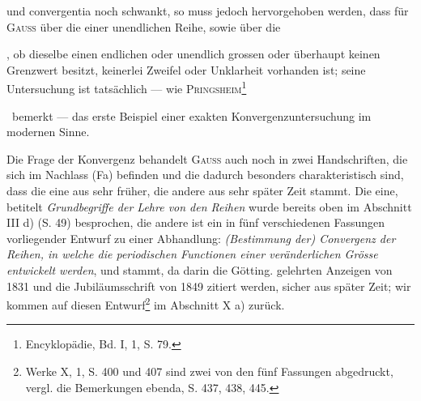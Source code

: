 und convergentia noch schwankt, so muss jedoch hervorgehoben werden, dass
für \textsc{Gauss} über die  einer unendlichen Reihe, sowie über die\par
\clearpage{}
\noindent {}, ob dieselbe einen endlichen oder unendlich grossen oder überhaupt
keinen Grenzwert besitzt, keinerlei Zweifel oder Unklarheit vorhanden ist;
seine Untersuchung ist tatsächlich — wie \textsc{Pringsheim}\begingroup\renewcommand{\thefootnote}{207a)}\footnote{Encyklopädie, Bd. I, 1, S. 79.}\addtocounter{footnote}{-1}\endgroup\ bemerkt — das erste
Beispiel einer exakten Konvergenzuntersuchung im modernen Sinne.
\par
Die Frage der Konvergenz behandelt \textsc{Gauss} auch noch in zwei Handschriften,
die sich im Nachlass (Fa) befinden und die dadurch besonders charakteristisch
sind, dass die eine aus sehr früher, die andere aus sehr später
Zeit stammt. Die eine, betitelt \textit{Grundbegriffe der Lehre von den Reihen} wurde
bereits oben im Abschnitt III d) (S. 49) besprochen, die andere ist ein in fünf verschiedenen
Fassungen vorliegender Entwurf zu einer Abhandlung: \textit{(Bestimmung
der) Convergenz der Reihen, in welche die periodischen Functionen einer veränderlichen
Grösse entwickelt werden}, und stammt, da darin die Götting. gelehrten
Anzeigen von 1831 und die Jubiläumsschrift von 1849 zitiert werden, sicher
aus später Zeit; wir kommen auf diesen Entwurf\footnote{Werke X, 1, S. 400 und 407 sind zwei von den fünf Fassungen abgedruckt, vergl. die Bemerkungen ebenda, S. 437, 438, 445.} im Abschnitt X a) zurück.
